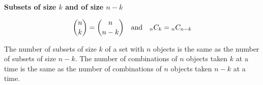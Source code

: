 {\bf Subsets of size $k$ and of size $n-k$}
\vskip 6pt

$${n\choose k}={n \choose n-k} \quad\hbox{and}\quad{}_nC_k={}_nC_{n-k}$$

The number of subsets of size $k$ of a set with $n$ objects is the same as the number of subsets of size $n-k$. The number of combinations of $n$ objects taken $k$ at a time is the same as the number of combinations of $n$ objects taken $n-k$ at a time.

\vfill\eject
